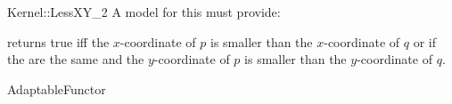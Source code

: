 \begin{ccRefFunctionObjectConcept}{Kernel::LessXY_2}
A model for this must provide:


{returns true iff the $x$-coordinate of $p$ is smaller than the
$x$-coordinate of $q$ or if the are the same and 
the $y$-coordinate of $p$ is smaller than the $y$-coordinate of $q$.}

\ccRefines
AdaptableFunctor

\ccSeeAlso
{}\\

\end{ccRefFunctionObjectConcept}
